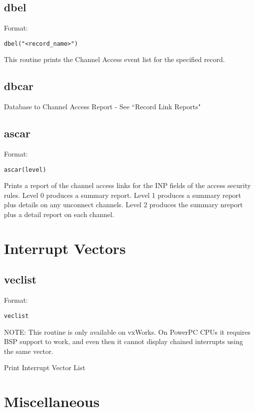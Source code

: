 \subsection{dbel}

Format:

\begin{verbatim}dbel("<record_name>")
\end{verbatim}This routine prints the Channel Access event list for the specified record.

\subsection{dbcar}

Database to Channel Access Report - See ``Record Link Reports"

\subsection{ascar}

Format:

\begin{verbatim}ascar(level)
\end{verbatim}Prints a report of the channel access links for the INP fields of the access security rules. Level 0 produces a summary 
report. Level 1 produces a summary report plus details on any unconnect channels. Level 2 produces the summary nreport 
plus a detail report on each channel.

\section{Interrupt Vectors}

\subsection{veclist}

Format:

\begin{verbatim}veclist
\end{verbatim}NOTE: This routine is only available on vxWorks. On PowerPC CPUs it requires BSP support to work, and even then it 
cannot display chained interrupts using the same vector.

Print Interrupt Vector List

\section{Miscellaneous}


